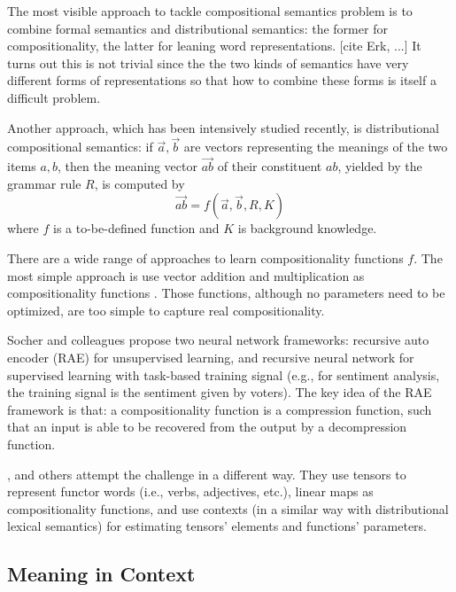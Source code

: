 \documentclass[11pt]{article}
\begin{document}
The most visible approach to tackle compositional semantics problem is to combine 
formal semantics and distributional semantics: the former for compositionality, the 
latter for leaning word representations. [cite Erk, ...] It turns out this is 
not trivial since the the two kinds of semantics have very different forms of representations
so that how to combine these forms is itself a difficult problem.

Another approach, which has been intensively studied recently, is distributional 
compositional semantics: 
if $\overrightarrow{a}, \overrightarrow{b}$ are vectors representing the meanings of 
the two items $a,b$, then the meaning vector $\overrightarrow{ab}$ of their constituent $ab$, 
yielded by the grammar rule $R$, is computed by \cite{mitchell_composition_2010}
\begin{equation}
\label{equation: general composition}
    \overrightarrow{ab} = f(\overrightarrow{a}, \overrightarrow{b}, R, K)
\end{equation}
where $f$ is a to-be-defined function and $K$ is background knowledge.

There are a wide range of approaches to learn compositionality functions $f$. 
The most simple approach is use vector addition and multiplication as compositionality functions
\cite{mitchell_vector-based_2008}. Those functions, although no parameters need to be optimized, 
are too simple to capture real compositionality. 

Socher and colleagues propose two neural network frameworks: recursive auto encoder (RAE) 
\cite{socher_semi-supervised_2011} for 
unsupervised learning, and recursive neural network for supervised learning with task-based 
training signal \cite{socher_learning_2010}
(e.g., for sentiment analysis, the training signal is the sentiment given by voters). 
The key idea of the RAE framework is that: a compositionality function is a compression function, 
such that an input is able to be recovered from the output by a decompression function. 

\cite{baroni_frege_2012}, \cite{grefenstette_multi-step_2013} and others attempt the challenge 
in a different way. 
They use tensors to represent functor words (i.e., verbs, adjectives, etc.), 
linear maps as compositionality functions, and use contexts (in a similar way with 
distributional lexical semantics) for estimating tensors' elements and 
functions' parameters. 

\subsection{Meaning in Context}
\label{subsection meaning in context}
\end{document}

